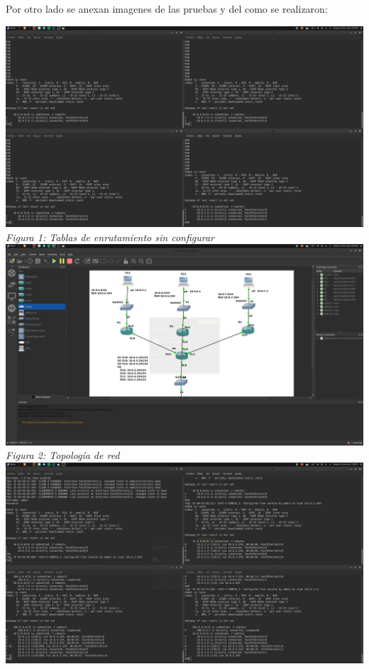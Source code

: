\documentclass[10pt]{article}
\begin{document}
Por otro lado se anexan imagenes de las pruebas y del como se realizaron:
\begin{center}
  \includegraphics[scale=0.25]{imgs/1.png}\\
  \textit{Figura 1: Tablas de enrutamiento sin configurar}
  \\
  \includegraphics[scale=0.25]{imgs/2.png}\\
  \textit{Figura 2: Topología de red}\\
  \includegraphics[scale=0.25]{imgs/3.png}\\

\end{center}
\end{document}
